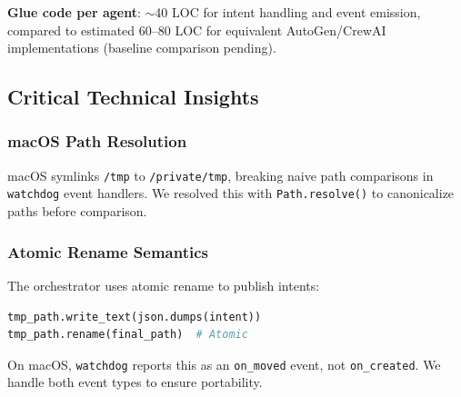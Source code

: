 \documentclass[11pt]{article}
\begin{document}
\textbf{Glue code per agent}: $\sim$40 LOC for intent handling and event emission, compared to estimated 60--80 LOC for equivalent AutoGen/CrewAI implementations (baseline comparison pending).

\subsection{Critical Technical Insights}

\subsubsection{macOS Path Resolution}

macOS symlinks \texttt{/tmp} to \texttt{/private/tmp}, breaking naive path comparisons in \texttt{watchdog} event handlers. We resolved this with \texttt{Path.resolve()} to canonicalize paths before comparison.

\subsubsection{Atomic Rename Semantics}

The orchestrator uses atomic rename to publish intents:
\begin{lstlisting}[language=python]
tmp_path.write_text(json.dumps(intent))
tmp_path.rename(final_path)  # Atomic
\end{lstlisting}

On macOS, \texttt{watchdog} reports this as an \texttt{on\_moved} event, not \texttt{on\_created}. We handle both event types to ensure portability.
\end{document}
